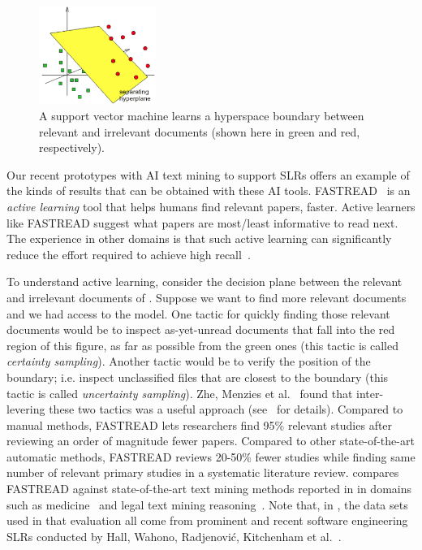 \begin{figure}
\includegraphics[width=1.5in]{figure_svm.png}
\caption{A support vector machine learns
a  hyperspace boundary between relevant and irrelevant documents (shown here in green and red, respectively).}\label{fig:svm}
\end{figure}
Our recent prototypes with AI text mining to support SLRs
offers an example of the kinds of results that can be obtained with 
these AI tools.
FASTREAD~\cite{Yu2019,Yu2018} is an {\em active learning} tool that helps
humans find relevant papers, faster.
Active learners like FASTREAD suggest what papers are most/least informative
to read next.   The experience in other domains is that  such  active learning can significantly
reduce the effort required to achieve high
recall~\cite{Cormack2017Navigating,Cormack2016Engineering,cormack2014evaluation,wallace2010semi,wallace2010active,wallace2011should,wallace2013active,Yu2018}. 



To understand active learning, consider the decision plane between the relevant    and   irrelevant
documents 
 of .
Suppose we want to find more relevant documents and we had access to the   model. One tactic for quickly finding those relevant documents would be to inspect as-yet-unread documents that fall into the red region of this figure, as far as possible from the green ones (this tactic is called {\em certainty sampling}). Another tactic would be to verify the position of the boundary; i.e. inspect unclassified files that are closest to the boundary (this tactic is called {\em uncertainty sampling}).  Zhe, Menzies et al.~\cite{Yu2018}  found that inter-levering these two tactics was a useful approach (see~\cite{Yu2019,Yu2018} for details).
Compared to manual methods, FASTREAD lets researchers find 95\% relevant studies after reviewing an order of magnitude fewer papers. Compared to other state-of-the-art automatic methods, FASTREAD reviews 20-50\% fewer studies while finding same number of relevant primary studies in a systematic literature review.
 compares FASTREAD against state-of-the-art text mining methods
reported in in domains such as medicine~\cite{wallace2010active,miwa2014reducing}
and legal text mining reasoning~\cite{cormack2014evaluation}.
Note that, in , the data sets used in that evaluation
all come from prominent and recent software engineering SLRs conducted by Hall, Wahono, Radjenovi{\'c}, Kitchenham et al.~\cite{ wahono2015systematic,hall2012systematic,radjenovic2013software,kitchenham2013systematic}. 

